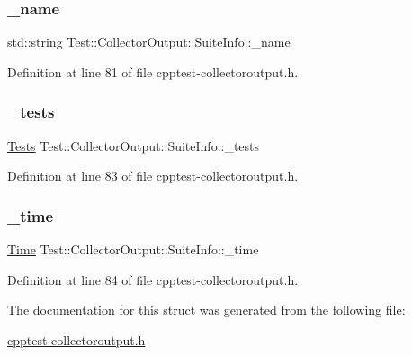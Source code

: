 \subsubsection{\texorpdfstring{\+\_\+name}{\_name}}
{\footnotesize\ttfamily std\+::string Test\+::\+Collector\+Output\+::\+Suite\+Info\+::\+\_\+name}



Definition at line 81 of file cpptest-\/collectoroutput.\+h.

\mbox{\label{struct_test_1_1_collector_output_1_1_suite_info_aeffb563714b2ba368e8c9cc92cb78091}} 
\subsubsection{\texorpdfstring{\+\_\+tests}{\_tests}}
{\footnotesize\ttfamily \mbox{\hyperlink{class_test_1_1_collector_output_a54a7b7c9b6d181102bc8934190b06e86}{Tests}} Test\+::\+Collector\+Output\+::\+Suite\+Info\+::\+\_\+tests}



Definition at line 83 of file cpptest-\/collectoroutput.\+h.

\mbox{\label{struct_test_1_1_collector_output_1_1_suite_info_a50173eba0cbf1c9e77bb029809a4580e}} 
\subsubsection{\texorpdfstring{\+\_\+time}{\_time}}
{\footnotesize\ttfamily \mbox{\hyperlink{class_test_1_1_time}{Time}} Test\+::\+Collector\+Output\+::\+Suite\+Info\+::\+\_\+time}



Definition at line 84 of file cpptest-\/collectoroutput.\+h.



The documentation for this struct was generated from the following file\+:\begin{DoxyCompactItemize}
\item 
\mbox{\hyperlink{cpptest-collectoroutput_8h}{cpptest-\/collectoroutput.\+h}}\end{DoxyCompactItemize}
